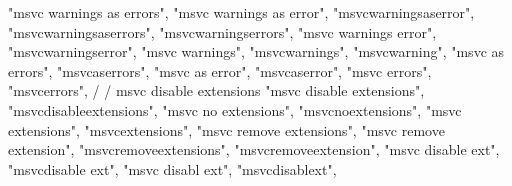 {{{{{{{{{        "msvc warnings as errors", 
        "msvc warnings as error", 
        "msvcwarningsaserror", 
        "msvcwarningsaserrors", 
        "msvcwarningserrors", 
        "msvc warnings error", 
        "msvcwarningserror", 
        "msvc warnings", 
        "msvcwarnings", 
        "msvcwarning", 
        "msvc as errors", 
        "msvcaserrors", 
        "msvc as error", 
        "msvcaserror", 
        "msvc errors", 
        "msvcerrors", 
        /
        / msvc disable extensions 
        "msvc disable extensions", 
        "msvcdisableextensions", 
        "msvc no extensions", 
        "msvcnoextensions", 
        "msvc extensions", 
        "msvcextensions", 
        "msvc remove extensions", 
        "msvc remove extension", 
        "msvcremoveextensions", 
        "msvcremoveextension", 
        "msvc disable ext", 
        "msvcdisable ext", 
        "msvc disabl ext", 
        "msvcdisablext", 

}}}}}}}}}
